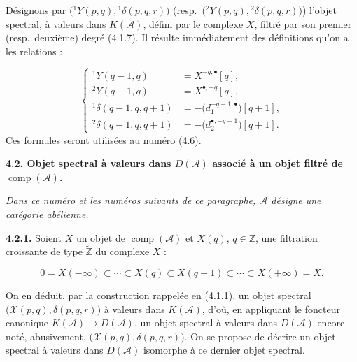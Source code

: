 \clearpage
{}%
\begingroup\small\setlength{\parskip}{0pt}\setlength{\emergencystretch}{1.5em}
\setlength{\abovedisplayskip}{4pt plus 2pt minus 2pt}%
\setlength{\belowdisplayskip}{4pt plus 2pt minus 2pt}%

\noindent Désignons par
$\bigl({}^{1}\!Y(p,q),{}^{1}\!\delta(p,q,r)\bigr)$ (resp.\ 
$\bigl({}^{2}\!Y(p,q),{}^{2}\!\delta(p,q,r)\bigr)$) l'objet spectral, à
valeurs dans $K(\mathcal A)$, défini par le complexe $X$, filtré par son
premier (resp.\ deuxième) degré (4.1.7). Il résulte immédiatement des
définitions qu'on a les relations :

\begin{equation}
\left\{
\begin{aligned}
{}^{1}\!Y(q-1,q)&=X^{-q,\bullet}[q],\\
{}^{2}\!Y(q-1,q)&=X^{\bullet,-q}[q],\\
{}^{1}\!\delta(q-1,q,q+1)&=-\bigl(d_1^{-q-1,\bullet}\bigr)[q+1],\\
{}^{2}\!\delta(q-1,q,q+1)&=-\bigl(d_2^{\bullet,-q-1}\bigr)[q+1].
\end{aligned}
\right.
\tag{4.1.9.1}
\end{equation}
Ces formules seront utilisées au numéro (4.6).

\medskip\noindent\textbf{4.2. Objet spectral à valeurs dans $D(\mathcal A)$
associé à un objet filtré de $\operatorname{comp}(\mathcal A)$.}

\medskip\noindent\emph{Dans ce numéro et les numéros suivants de ce
paragraphe, $\mathcal A$ désigne une catégorie abélienne.}

\medskip\noindent\textbf{4.2.1.}\quad
Soient $X$ un objet de $\operatorname{comp}(\mathcal A)$ et $X(q)$,
$q\in\mathbb Z$, une filtration croissante de type
$\widetilde{\mathbb Z}$ du complexe $X$ :

\begin{equation}
0=X(-\infty)\subset\cdots\subset X(q)\subset X(q+1)
\subset\cdots\subset X(+\infty)=X.
\tag{4.2.1.1}
\end{equation}

On en déduit, par la construction rappelée en (4.1.1), un objet spectral
$\bigl(\mathcal X(p,q),\delta(p,q,r)\bigr)$ à valeurs dans
$K(\mathcal A)$, d'où, en appliquant le foncteur canonique
$K(\mathcal A)\longrightarrow D(\mathcal A)$, un objet spectral à valeurs
dans $D(\mathcal A)$ encore noté, abusivement,
$\bigl(\mathcal X(p,q),\delta(p,q,r)\bigr)$. On se propose de décrire un
objet spectral à valeurs dans $D(\mathcal A)$ isomorphe à ce dernier objet
spectral.

